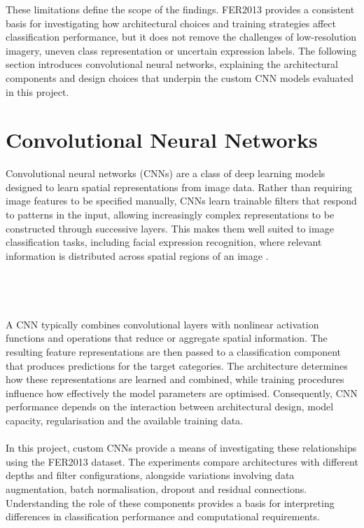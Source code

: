 \documentclass[12pt, a4paper]{report}
\let\oldsection\section
\renewcommand{\section}{%
    \Needspace{6\baselineskip}%
    \oldsection
}
\begin{document}
				These limitations define the scope of the findings. FER2013 provides a consistent basis for investigating how architectural choices and training strategies affect classification performance, but it does not remove the challenges of low-resolution imagery, uneven class representation or uncertain expression labels. The following section introduces convolutional neural networks, explaining the architectural components and design choices that underpin the custom CNN models evaluated in this project.
				
		\section{Convolutional Neural Networks}
			
			Convolutional neural networks (CNNs) are a class of deep learning models designed to learn spatial representations from image data. Rather than requiring image features to be specified manually, CNNs learn trainable filters that respond to patterns in the input, allowing increasingly complex representations to be constructed through successive layers. This makes them well suited to image classification tasks, including facial expression recognition, where relevant information is distributed across spatial regions of an image \cite{LeCun1998Gradient, Sutar2023DeepFER}.\\\\\\\\\\
			A CNN typically combines convolutional layers with nonlinear activation functions and operations that reduce or aggregate spatial information. The resulting feature representations are then passed to a classification component that produces predictions for the target categories. The architecture determines how these representations are learned and combined, while training procedures influence how effectively the model parameters are optimised. Consequently, CNN performance depends on the interaction between architectural design, model capacity, regularisation and the available training data.\\\\
			In this project, custom CNNs provide a means of investigating these relationships using the FER2013 dataset. The experiments compare architectures with different depths and filter configurations, alongside variations involving data augmentation, batch normalisation, dropout and residual connections. Understanding the role of these components provides a basis for interpreting differences in classification performance and computational requirements.
			
\end{document}
